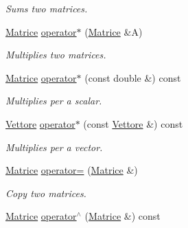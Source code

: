 \begin{DoxyCompactItemize}
\begin{DoxyCompactList}\small\item\em Sums two matrices. \end{DoxyCompactList}\item 
\hyperlink{classMatrice}{Matrice} \hyperlink{classMatrice_aa448fbb42e5073bb139ec73ce86f852f}{operator$\ast$} (\hyperlink{classMatrice}{Matrice} \&A)\hypertarget{classMatrice_aa448fbb42e5073bb139ec73ce86f852f}{}\label{classMatrice_aa448fbb42e5073bb139ec73ce86f852f}

\begin{DoxyCompactList}\small\item\em Multiplies two matrices. \end{DoxyCompactList}\item 
\hyperlink{classMatrice}{Matrice} \hyperlink{classMatrice_ab0ddc1000224f226a80a9efeabec28cd}{operator$\ast$} (const double \&) const \hypertarget{classMatrice_ab0ddc1000224f226a80a9efeabec28cd}{}\label{classMatrice_ab0ddc1000224f226a80a9efeabec28cd}

\begin{DoxyCompactList}\small\item\em Multiplies per a scalar. \end{DoxyCompactList}\item 
\hyperlink{classVettore}{Vettore} \hyperlink{classMatrice_abc91a90deb2e320dbbf546014d757631}{operator$\ast$} (const \hyperlink{classVettore}{Vettore} \&) const \hypertarget{classMatrice_abc91a90deb2e320dbbf546014d757631}{}\label{classMatrice_abc91a90deb2e320dbbf546014d757631}

\begin{DoxyCompactList}\small\item\em Multiplies per a vector. \end{DoxyCompactList}\item 
\hyperlink{classMatrice}{Matrice} \hyperlink{classMatrice_a9d7b0347594ca071c5a3048d2d3002cb}{operator=} (\hyperlink{classMatrice}{Matrice} \&)\hypertarget{classMatrice_a9d7b0347594ca071c5a3048d2d3002cb}{}\label{classMatrice_a9d7b0347594ca071c5a3048d2d3002cb}

\begin{DoxyCompactList}\small\item\em Copy two matrices. \end{DoxyCompactList}\item 
\hyperlink{classMatrice}{Matrice} \hyperlink{classMatrice_a06abc8a7b97cb5042c6b21d0daf58619}{operator$^\wedge$} (\hyperlink{classMatrice}{Matrice} \&) const \hypertarget{classMatrice_a06abc8a7b97cb5042c6b21d0daf58619}{}\label{classMatrice_a06abc8a7b97cb5042c6b21d0daf58619}


\end{DoxyCompactItemize}
